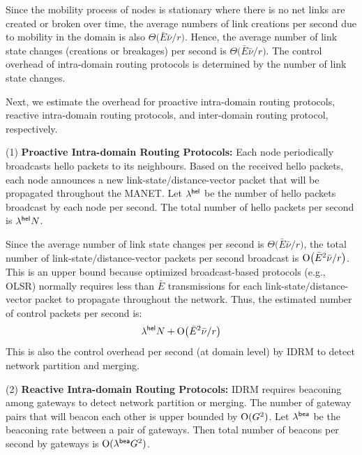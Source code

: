 Since the mobility process of nodes is stationary where there is no net links
are created or broken over time, the average numbers of link creations
per second due to mobility in the domain is also
$\Theta\big(\bar{E}\bar{\nu}\slash r\big)$.  Hence, the
average number of link state changes (creations or breakages) per
second is $\Theta\big(\bar{E}\bar{\nu}\slash r\big)$.
The control overhead of intra-domain routing protocols is determined
by the number of link state changes. 

Next, we estimate the overhead for proactive intra-domain routing protocols, reactive intra-domain routing protocols, and inter-domain routing protocol, respectively.


(1) {\bf Proactive Intra-domain Routing Protocols:} Each node periodically broadcasts hello
packets to its neighbours. Based on the received hello packets, each node
announces a new link-state$\slash$distance-vector packet that will be
propagated throughout the MANET.
Let $\lambda^{\sf hel}$ be the number of hello packets broadcast by
each node per second. The total number of hello packets per second is
$\lambda^{\sf hel}   {N}$.

Since the average number of link state changes per second is
$\Theta\big(\bar{E}\bar{\nu}\slash r\big)$, the total
number of link-state$\slash$distance-vector packets per second broadcast  
is ${\rm O}\big(\bar{E}^2 \bar{\nu}\slash r\big)$.
This is an upper bound because optimized broadcast-based protocols
(e.g., OLSR) normally requires less than $\bar{E}$ transmissions
for each link-state$\slash$distance-vector packet to propagate
throughout the network.  Thus, the estimated number of control packets
per second is: %
\begin{equation} \label{eq:pro-oh}
\lambda^{\sf hel}   {N} + {\rm O}\big(\bar{E}^2 \bar{\nu}\slash r\big) %
\end{equation}
This is also the control overhead per second (at domain level) by IDRM 
to detect network partition and merging.



(2) {\bf Reactive Intra-domain Routing Protocols:} 
IDRM requires beaconing among gateways
to detect network partition or merging. The number of gateway pairs
that will beacon each other is upper bounded by
${\rm O}({G}^2)$.
Let $\lambda^{\sf bea}$ be the beaconing rate between a pair of
gateways. Then total number of beacons per second by
gateways is ${\rm O}(\lambda^{\sf bea} {G}^2)$.

